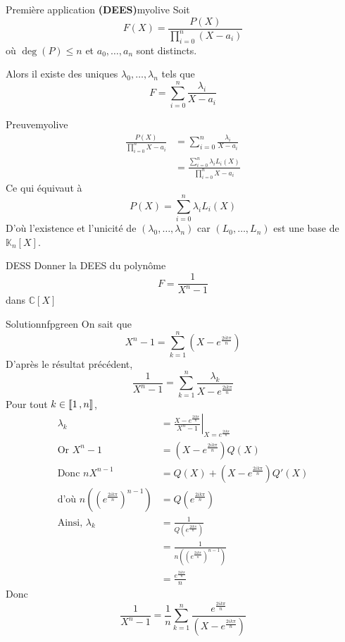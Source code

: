     \begin{omed}{Première application \textbf{(DEES)}}{myolive}
        Soit 
        \[ F(X) = \frac{P(X)}{\prod_{i=0}^n (X-a_i)} \] 
        où $\deg(P) \leq n$ et $a_0,\ldots,a_n$ sont distincts.

        Alors il existe des uniques $\lambda_0,\ldots,\lambda_n$ tels que 
        \[ F = \sum_{i=0}^{n} \frac{\lambda_i}{X - a_i} \]
    \end{omed}

    \begin{demo}{Preuve}{myolive}
        \begin{align*}
            \frac{P(X)}{\prod_{i=0}^{n} X - a_i} 
            &= \sum_{i=0}^{n} \frac{\lambda_i}{X - a_i} \\
            &= \frac{\sum_{i=0}^{n} \lambda_i L_i(X)}{\prod_{i=0}^{n} X-a_i}
        \end{align*}
        Ce qui équivaut à 
        \[ P(X) = \sum_{i=0}^{n} \lambda_i L_i(X) \]   
        D’où l’existence et l’unicité de $(\lambda_0,\ldots,\lambda_n)$ car $(L_0,\ldots,L_n)$ est une base de $\mathbb{K}_n[X]$.
    \end{demo}

    \begin{exo}{DESS}{}
        Donner la DEES du polynôme 
        \[ F = \frac{1}{X^n - 1} \]   
        dans $\mathbb{C}[X]$
    \end{exo}

    \begin{demo}{Solution}{nfpgreen}
        On sait que 
        \[ X^n - 1 = \sum_{k=1}^{n} \left(X - e^{\frac{2ik\pi}{n}}\right) \]
        D’après le résultat précédent, 
        \[ \frac{1}{X^n - 1} = \sum_{k=1}^{n} \frac{\lambda_k}{X - e^{\frac{2ik\pi}{n}}} \]
        Pour tout $k \in \left\llbracket 1 \, , n \right\rrbracket$, 
        \begin{align*}
            \lambda_k 
            &= \left. \frac{X - e^{\frac{2ik\pi}{n}}}{X^n - 1} \right|_{X = e^{\frac{2ik \pi}{n}}} \\
            \text{Or } X^n - 1 
            &= \left( X - e^{\frac{2ik\pi}{n}} \right) Q(X) \\
            \text{Donc } nX^{n-1} 
            &= Q(X) + (X- e^{\frac{2ik\pi}{n}}) Q'(X) \\
            \text{d’où } n \left( \left(e^{\frac{2ik\pi}{n}}\right)^{n-1} \right)
            &= Q\left( e^{\frac{2ik\pi}{n}} \right) \\
            \text{Ainsi, } \lambda_k 
            &= \frac{1}{Q\left(e^{\frac{2ik\pi}{n}}\right)} \\
            &= \frac{1}{n \left( \left(e^{\frac{2ik\pi}{n}}\right)^{n-1} \right)} \\
            &= \frac{e^{\frac{2ik\pi}{n}}}{n}
        \end{align*}
        Donc 
        \[ \frac{1}{X^n -1} = \frac{1}{n} \sum_{k=1}^{n} \frac{e^{\frac{2ik\pi}{n}}}{(X - e^{\frac{2ik\pi}{n}})} \]
    \end{demo}


